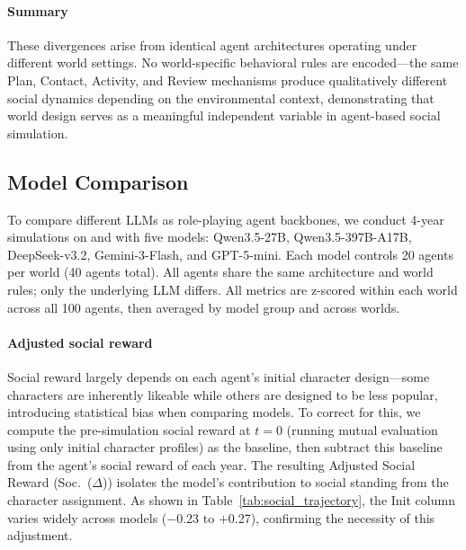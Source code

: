 \paragraph{Summary}
These divergences arise from identical agent architectures operating under
different world settings.
No world-specific behavioral rules are encoded---the same Plan, Contact,
Activity, and Review mechanisms produce qualitatively different social dynamics
depending on the environmental context,
demonstrating that world design serves as a meaningful independent variable
in agent-based social simulation.


\subsection{Model Comparison}
\label{sec:appendix_model_comparison}

To compare different LLMs as role-playing agent backbones,
we conduct 4-year simulations on \campus{} and \academy{}
with five models:
Qwen3.5-27B, Qwen3.5-397B-A17B,
DeepSeek-v3.2, Gemini-3-Flash,
and GPT-5-mini.
Each model controls 20 agents per world (40 agents total).
All agents share the same architecture and world rules;
only the underlying LLM differs.
All metrics are z-scored within each world across all 100 agents,
then averaged by model group and across worlds.

\paragraph{Adjusted social reward}
Social reward largely depends on each agent's initial character design---some
characters are inherently likeable while others are designed to be less popular,
introducing statistical bias when comparing models.
To correct for this,
we compute the pre-simulation social reward at $t=0$ (running mutual evaluation using only initial character profiles) as the baseline,
then subtract this baseline from the agent's social reward of each year.
The resulting Adjusted Social Reward (Soc.~($\Delta$))
isolates the model's contribution to social standing
from the character assignment.
As shown in Table~\ref{tab:social_trajectory},
the Init column varies widely across models ($-$0.23 to $+$0.27),
confirming the necessity of this adjustment.

